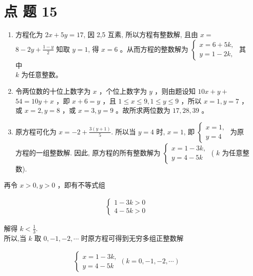 \documentclass[10pt]{article}
\begin{document}
\section*{点 题 15}
\begin{enumerate}
  \item 方程化为 $2 x+5 y=17$, 因 2,5 互素, 所以方程有整数解, 且由 $x=$ $8-2 y+\frac{1-y}{2}$ 知取 $y=1$, 得 $x=6$ 。从而方程的整数解为 $\left\{\begin{array}{l}x=6+5 k, \\ y=1-2 k,\end{array}\right.$ 其中\\
$k$ 为任意整数。
  \item 令两位数的十位上数字为 $x$ ，个位上数字为 $y$ ，则由题设知 $10 x+y+$ $54=10 y+x$ ，即 $x+6=y$ ，且 $1 \leqslant x \leqslant 9,1 \leqslant y \leqslant 9$ ，所以 $x=1, y=7$ ，或 $x=2, y=8$ ，或 $x=3, y=9$ 。故所求两位数为 $17,28,39$ 。
  \item 原方程可化为 $x=-2+\frac{3(y+1)}{5}$. 所以当 $y=4$ 时, $x=1$, 即 $\left\{\begin{array}{l}x=1, \\ y=4\end{array}\right.$ 为原方程的一组整数解. 因此, 原方程的所有整数解为 $\left\{\begin{array}{l}x=1-3 k, \\ y=4-5 k\end{array}\right.$ ( $k$ 为任意整数).
\end{enumerate}

再令 $x>0, y>0$ ，即有不等式组

\begin{align*}
\left\{\begin{array}{l}
1-3 k>0 \\
4-5 k>0
\end{array}\right.
\end{align*}

解得 $k<\frac{1}{3}$.\\
所以,当 $k$ 取 $0,-1,-2, \cdots$ 时原方程可得到无穷多组正整数解

\begin{align*}
\left\{\begin{array}{l}
x=1-3 k, \\
y=4-5 k
\end{array}(k=0,-1,-2, \cdots)\right.
\end{align*}
\end{document}
